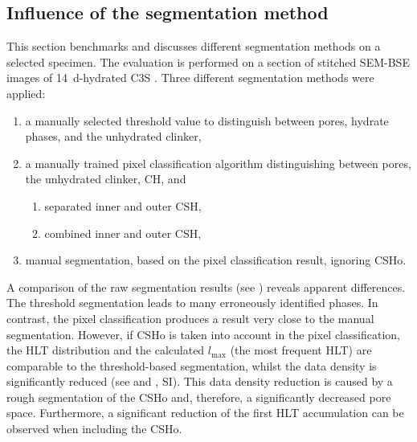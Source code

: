 \subsection{Influence of the segmentation method}

This section benchmarks and discusses different segmentation methods on a selected specimen.
The evaluation is performed on a  section of stitched \ac{SEM}-\ac{BSE} images of \qty{14}{\day}-hydrated \ac{C3S} \cite{kleiner.2024a}.
Three different segmentation methods were applied:

\begin{enumerate}
	\item a manually selected threshold value to distinguish between pores, hydrate phases, and the unhydrated clinker,
	\item a manually trained pixel classification algorithm distinguishing between pores, the unhydrated clinker, \ac{CH}, and
	\begin{enumerate}
		\item separated inner and outer \ac{CSH},
		\item combined inner and outer \ac{CSH},
	\end{enumerate}
	\item manual segmentation, based on the pixel classification result, ignoring \ac{CSHo}.
\end{enumerate}

A comparison of the raw segmentation results (see ) reveals apparent differences.
The threshold segmentation leads to many erroneously identified phases.
In contrast, the pixel classification produces a result very close to the manual segmentation.
However, if \ac{CSHo} is taken into account in the pixel classification, the \ac{HLT} distribution and the calculated $l_\text{max}$ (the most frequent \ac{HLT}) are comparable to the threshold-based segmentation, whilst the data density is significantly reduced (see  and  \cite{kleiner.2024}, \ac{SI}).
This data density reduction is caused by a rough segmentation of the \ac{CSHo} and, therefore, a significantly decreased pore space.
Furthermore, a significant reduction of the first \ac{HLT} accumulation can be observed when including the \ac{CSHo}.%

